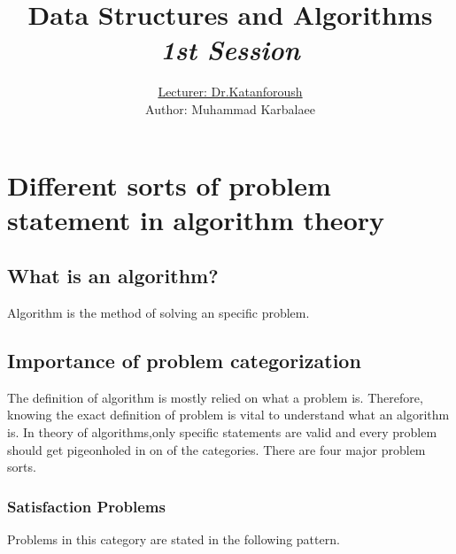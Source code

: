 \documentclass[twocolumn,a4paper, 10pt]{article}
\title{\textbf{Data Structures and Algorithms} \\ \emph{1st Session}}
\author{\underline{Lecturer: Dr.Katanforoush} \\ \small{Author: Muhammad Karbalaee}}
\begin{document}
	\posttitle{\end{center}}
	\maketitle
    \tableofcontents

    \clearpage
    \section{Different sorts of problem statement in algorithm theory}
        \subsection{What is an algorithm?}
            Algorithm is the method of solving an specific problem.
        \subsection{Importance of problem categorization}
            The definition of algorithm is mostly relied on what a problem is.
            Therefore, knowing the exact definition of problem is vital to understand
            what an algorithm is.
            In theory of algorithms,only specific statements are valid and every problem
            should get pigeonholed in on of the categories. There are four major problem sorts.
            \subsubsection{Satisfaction Problems}
                Problems in this category are stated in the following pattern. 
\end{document}
